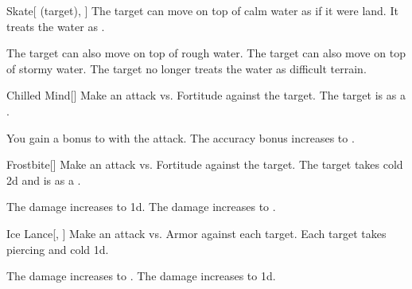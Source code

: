 \lowercase{\hypertarget{spell:Skate}{}}\label{spell:Skate}
\begin{attuneability}[Rank 1]{\hypertarget{spell:Skate}{Skate}}[ (target), ]
The target can move on top of calm water as if it were land.
It treats the water as .

\rankline
{} The target can also move on top of rough water.
 The target can also move on top of stormy water.
 The target no longer treats the water as difficult terrain.
\end{attuneability}
\vspace{0.25em}



\lowercase{\hypertarget{spell:Chilled Mind}{}}\label{spell:Chilled Mind}
\begin{freeability}[Rank 3]{\hypertarget{spell:Chilled Mind}{Chilled Mind}}[]
Make an attack vs. Fortitude against the target.
\hit The target is  as a .

\rankline
{} You gain a  bonus to  with the attack.
 The accuracy bonus increases to .
\end{freeability}
\vspace{0.25em}



\lowercase{\hypertarget{spell:Frostbite}{}}\label{spell:Frostbite}
\begin{freeability}[Rank 3]{\hypertarget{spell:Frostbite}{Frostbite}}[]
Make an attack vs. Fortitude against the target.
\hit The target takes cold  \minus2d and is  as a .

\rankline
{} The damage increases to  \minus1d.
 The damage increases to .
\end{freeability}
\vspace{0.25em}



\lowercase{\hypertarget{spell:Ice Lance}{}}\label{spell:Ice Lance}
\begin{freeability}[Rank 3]{\hypertarget{spell:Ice Lance}{Ice Lance}}[, ]
Make an attack vs. Armor against each target.
\hit Each target takes piercing and cold  \minus1d.

\rankline
{} The damage increases to .
 The damage increases to  \plus1d.
\end{freeability}
\vspace{0.25em}



